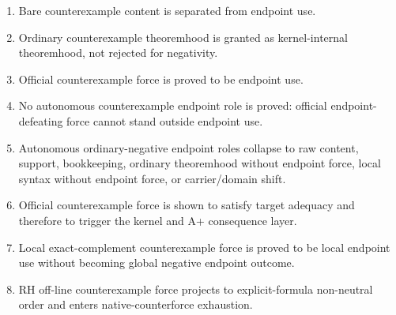 \documentclass[11pt]{article}
\begin{document}
\begin{enumerate}
\item Bare counterexample content is separated from endpoint use.
\item Ordinary counterexample theoremhood is granted as kernel-internal theoremhood, not rejected for negativity.
\item Official counterexample force is proved to be endpoint use.
\item No autonomous counterexample endpoint role is proved: official endpoint-defeating force cannot stand outside endpoint use.
\item Autonomous ordinary-negative endpoint roles collapse to raw content, support, bookkeeping, ordinary theoremhood without endpoint force, local syntax without endpoint force, or carrier/domain shift.
\item Official counterexample force is shown to satisfy target adequacy and therefore to trigger the kernel and A+ consequence layer.
\item Local exact-complement counterexample force is proved to be local endpoint use without becoming global negative endpoint outcome.
\item RH off-line counterexample force projects to explicit-formula non-neutral order and enters native-counterforce exhaustion.
\end{enumerate}
\end{document}
